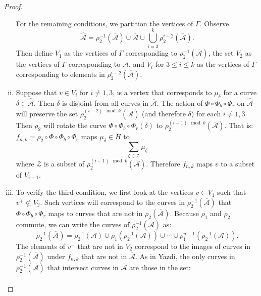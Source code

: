\begin{proof}
\begin{enumerate}[(i)]
\medskip
For the remaining conditions, we partition the vertices of $\Gamma$.  Observe
$$\widehat{\mathcal{A}} = \rho_{2}^{-1}(\overline{\mathcal{A}})\cup\overline{\mathcal{A}}\cup\bigcup_{i=3}^k \rho_2^{i-2}(\overline{\mathcal{A}}).$$ Then define $V_1$ as the vertices of $\Gamma$ corresponding to $\rho_2^{-1}(\overline{\mathcal{A}})$, the set $V_2$ as the vertices of $\Gamma$ corresponding to $\overline{\mathcal{A}}$, and $V_i$ for
$3 \leq i \leq k$ as the vertices of $\Gamma$ corresponding to elements in
$\rho_2^{i-2}(\overline{\mathcal{A}})$.
\item Suppose that $v \in V_i$ for $i \neq 1,3$, is a vertex
  that corresponds to $\mu_\delta$ for a curve $\delta \in \widehat{\mathcal{A}}$.  %
  Then $\delta$ is disjoint from all curves in $\overline{\mathcal{A}}$.  The action of $\Phi\circ\Phi_b\circ\Phi_r$ on $\widehat{\mathcal{A}}$ will preserve the set $\rho_2^{(i-2)\mod k}(\overline{\mathcal{A}})$ (and therefore $\delta$) for each $i\neq 1,3$.  %
  Then $\rho_2$ will rotate the curve $\Phi\circ \Phi_b\circ\Phi_r(\delta)$ to $\rho_2^{(i-1)\mod k}(\overline{\mathcal{A}})$. That is: $f_{n,k}=\rho_2\circ\Phi\circ\Phi_b\circ\Phi_r$ maps $\mu_\delta\in H$ to $$\sum_{\zeta\in \mathcal{Z}}\mu_\zeta$$ where $\mathcal{Z}$ is a subset of $\rho_2^{(i-1)\mod k}(\overline{\mathcal{A}})$.  Therefore $f_{n,k}$ maps $v$ to a subset of $V_{i+1}$.
\item To verify the third condition, we first look at the vertices $v \in V_1$ such that $v^+ \not\subset V_2$. Such vertices will correspond to the curves in $\rho_2^{-1}(\overline{\mathcal{A}})$ that $\Phi\circ\Phi_b\circ\Phi_r$ maps to curves that are not in $\rho_2(\overline{\mathcal{A}})$.  Because $\rho_1$ and $\rho_2$ commute, we can write the curves of $\rho_2^{-1}(\overline{\mathcal{A}})$ as:
    $$\rho_2^{-1}(\overline{\mathcal{A}})=\rho_2^{-1}(\mathcal{A})\cup\rho_1(\rho_2^{-1}(\mathcal{A}))\cup\cdots\cup\rho_1^{n-1}(\rho_2^{-1}(\mathcal{A})).$$  The elements of $v^+$ that are not in $V_2$ correspond to the images of curves in $\rho_2^{-1}(\overline{\mathcal{A}})$ under $f_{n,k}$ that are not in $\overline{\mathcal{A}}$.
As in Yazdi, the only curves in $\rho_2^{-1}(\overline{\mathcal{A}})$ that intersect curves in $\overline{\mathcal{A}}$ are those in the set:
\begin{align*}

\end{align*}
\end{enumerate}
\end{proof}
